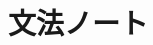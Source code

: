 \documentclass[uplatex,dvipdfmx,b5paper,english,10pt]{jsbook}
\newif\ifGRAMMARNOTES
\begin{document}
%
%
%
%
\fi%



\ifGRAMMARNOTES
\ifEnglish
\chapter{Grammar notes}
\else
\chapter{文法ノート}
\fi
\end{document}
